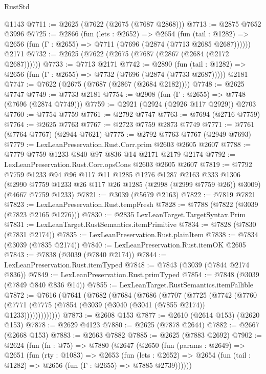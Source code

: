 \begin{lexlean}{RustStd}
\begin{coremodule}
    @1143
@7711 := @2625 (@7622 (@2675 (@7687 @2868)))
@7713 := @2875 @7652 @3996
@7725 := @2866
    (fun (lets : @2652) =>
    @2654
      (fun (tail : @1282) => @2656 (fun (Γ : @2655) => @7711 (@7696 (@2874 (@7713 @2685 @2687))))))
    @2171
@7732 := @2625 (@7622 (@2675 (@7687 (@2867 (@2684 (@2172 @2687))))))
@7733 := @7713 @2171
@7742 := @2890
    (fun (tail : @1282) => @2656 (fun (Γ : @2655) => @7732 (@7696 (@2874 (@7733 @2687)))))
    @2181
@7747 := @7622 (@2675 (@7687 (@2867 (@2684 @2182))))
@7748 := @2625 @7747
@7749 := @7733 @2181
@7754 := @2908 (fun (Γ : @2655) => @7748 (@7696 (@2874 @7749)))
@7759 := @2921 (@2924 (@2926 @117 @2929)) @2703
@7760 := @7754 @7759
@7761 := @2792 @7747
@7763 := @7694 (@2716 @7759)
@7764 := @2625 @7763
@7767 := @2723 @7759 @2873 @7749
@7771 := @7761 (@7764 @7767) (@2944 @7621)
@7775 := @2792 @7763 @7767 (@2949 @7693)
@7779 := LexLeanPreservation.Rust.Corr.prim @2603 @2605 @2607
@7788 := @7779 @7759 @1233 @840 @97 @836 @14 @2171 @2179 @2174
@7792 := LexLeanPreservation.Rust.Corr.opsCons @2603 @2605 @2607
@7819 := @7792
    @7759
    @1233
    @94
    @96
    @117
    @11
    @1285
    @1276
    @1287
    @2163
    @333
    @1306
    (@2990 @7759 @1233 @26 @117 @26 @1285 (@2998 (@2999 @7759 @26)) @3009)
    (@4667 @7759 @1233)
@7821 := @3039 (@5679 @2163)
@7822 := @7819 @7821
@7823 := LexLeanPreservation.Rust.tempFresh
@7828 := @7788 (@7822 (@3039 (@7823 @2165 @1276)))
@7830 := @2835 LexLeanTarget.TargetSyntax.Prim
@7831 := LexLeanTarget.RustSemantics.itemPrimitive
@7834 := @7828 (@7830 (@7831 @2174))
@7835 := LexLeanPreservation.Rust.plainItem
@7838 := @7834 (@3039 (@7835 @2174))
@7840 := LexLeanPreservation.Rust.itemOK @2605
@7843 := @7838 (@3039 (@7840 @2174))
@7844 := LexLeanPreservation.Rust.itemTyped
@7848 := @7843 (@3039 (@7844 @2174 @836))
@7849 := LexLeanPreservation.Rust.primTyped
@7854 := @7848 (@3039 (@7849 @840 @836 @14))
@7855 := LexLeanTarget.RustSemantics.itemFallible
@7872 := @7616
    (@7641
      (@7682
        (@7684
          (@7686
            (@7707
              (@7725
                (@7742
                  (@7760 (@7771 (@7775 (@7854 (@3039 (@3040 (@3041 (@7855 @2174)) @1233)))))))))))))
@7873 := @2608 @153
@7877 := @2610 (@2614 @153) (@2620 @153)
@7878 := @2629 @4123
@7880 := @2625 (@7878 @2644)
@7882 := @2667 (@2668 @153)
@7883 := @2663 @7882
@7885 := @2625 (@7883 @2692)
@7902 := @2624
    (fun (fn : @75) =>
    @7880
      (@2647
        (@2650
          (fun (params : @2649) =>
          @2651
            (fun (rty : @1083) =>
            @2653
              (fun (lets : @2652) =>
              @2654 (fun (tail : @1282) => @2656 (fun (Γ : @2655) => @7885 @2739))))))

\end{coremodule}
\end{lexlean}
